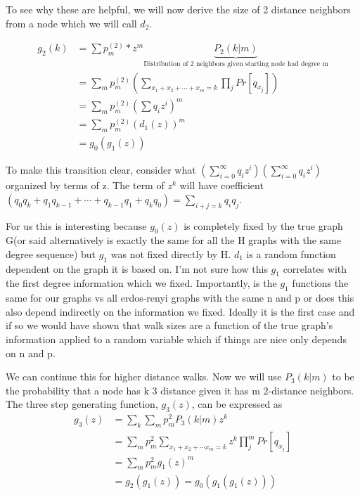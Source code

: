 \documentclass[11pt]{article}
\begin{document}
To see why these are helpful, we will now derive the size of 2 distance neighbors from a node which we will call $d_{2}$.

\begin{align*}
  g_{2}(k) &= \sum p^{(2)}_{m} * z^{m} \underbrace{P_{2}(k|m)}_{\text{Distribution of 2 neighbors given starting node had degree m}} \\
           &= \sum_{m} p^{(2)}_{m} \left( \sum_{x_{1} + x_{2} + \cdots + x_{m} =k } \prod_{j} Pr[q_{x_{j}}]  \right) \\
           &= \sum_{m} p^{(2)}_{m} {(\sum q_{i} z^{i})}^{m} \\
           &= \sum_{m} p^{(2)}_{m} (d_{1}(z))^{m} \\
  &= g_{0}(g_{1}(z))
\end{align*}

To make this transition clear, consider what $(\sum_{i=0}^{\infty} q_{i} z^{i})(\sum_{i=0}^{\infty} q_{i} z^{i})$ organized by terms of z. The term of $z^{k}$ will have coefficient $(q_{0}q_{k} + q_{1}q_{k-1}+\cdots + q_{k-1}q_{1} + q_{k}q_{0} ) = \sum_{i+j=k} q_{i}q_{j}$.

For us this is interesting because $g_{0}(z)$ is completely fixed by the true graph G(or said alternatively is exactly the same for all the H graphs with the same degree sequence) but $g_{1}$ was not fixed directly by H. $d_{1}$ is a random function dependent on the graph it is based on. I'm not sure how this $g_{1}$ correlates with the first degree information which we fixed. Importantly, is the $g_{1}$ functions the same for our graphs vs all erdos-renyi graphs with the same n and p or does this also depend indirectly on the information we fixed. Ideally it is the first case and if so we would have shown that walk sizes are a function of the true graph's information applied to a random variable which if things are nice only depends on n and p.

We can continue this for higher distance walks. Now we will use $P_{3}(k|m)$ to be the probability that a node has k 3 distance given it has m 2-distance neighbors.  The three step generating function, $g_{3}(z)$, can be expressed as
\begin{align*}
  g_{3}(z) &= \sum_{k} \sum_{m} p^{2}_{m}  P_{3} (k|m) z^{k} \\
           &= \sum_{m} p^{2}_{m} \sum_{x_{1} + x_{2}+\cdots x_{m}=k} z^{k} \prod_{j}^{m} Pr[q_{x_{j}}] \\
           &= \sum_{m} p^{2}_{m} g_{1} (z)^{m} \\
  &= g_{2} ( g_{1} ( z)) = g_{0} ( g_{1} ( g_{1} ( z)))
\end{align*}
\end{document}
